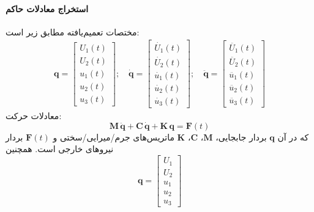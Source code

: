 \paragraph{استخراج معادلات حاکم}
مختصات تعمیم‌یافته مطابق زیر است:
\begin{align}\label{Eq.generalized.coordinate.2dof3dof}
    \mathbf{q} =
    \begin{bmatrix}
        U_1(t) \\
        U_2(t) \\
        u_1(t) \\
        u_2(t) \\
        u_3(t)
    \end{bmatrix};\quad
    \dot{\mathbf{q}} =
    \begin{bmatrix}
        \dot{U_1}(t) \\
        \dot{U_2}(t) \\
        \dot{u_1}(t) \\
        \dot{u_2}(t) \\
        \dot{u_3}(t)
    \end{bmatrix};\quad
    \ddot{\mathbf{q}} =
    \begin{bmatrix}
        \ddot{U_1}(t) \\
        \ddot{U_2}(t) \\
        \ddot{u_1}(t) \\
        \ddot{u_2}(t) \\
        \ddot{u_3}(t)
    \end{bmatrix}
\end{align}
معادلات حرکت:
\begin{equation} \label{Eq.EOM_dimensional_combined}
    \mathbf{M} \, \ddot{\mathbf{q}} + \mathbf{C} \, \dot{\mathbf{q}} + \mathbf{K} \, \mathbf{q} = \mathbf{F}(t)
\end{equation}
که در آن $\mathbf{q}$ بردار جابجایی، $\mathbf{M}$، $\mathbf{C}$، $\mathbf{K}$ ماتریس‌های جرم/میرایی/سختی و $\mathbf{F}(t)$ بردار نیروهای خارجی است. همچنین
\begin{equation}\label{Eq.generalized_coordinate_combined}
    \mathbf{q} = 
  \begin{bmatrix}
    U_1 \\ U_2 \\ u_1 \\ u_2 \\ u_3
  \end{bmatrix}
\end{equation}

